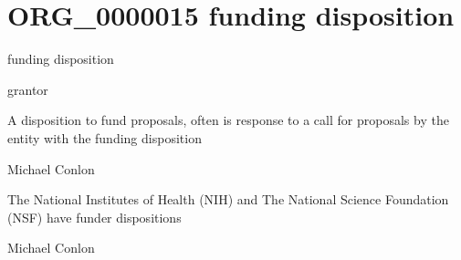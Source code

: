 \documentclass[letterpaper,10pt,english]{sphinxmanual}
\begin{document}
\section{ORG\_0000015 \sphinxhyphen{} funding disposition}
\label{\detokenize{doc-ORG_0000015:org-0000015-funding-disposition}}\label{\detokenize{doc-ORG_0000015:index-0}}\label{\detokenize{doc-ORG_0000015::doc}}
\begin{sphinxShadowBox}

\sphinxAtStartPar
funding disposition
\end{sphinxShadowBox}

\begin{sphinxShadowBox}

\sphinxAtStartPar
grantor
\end{sphinxShadowBox}

\begin{sphinxShadowBox}

\sphinxAtStartPar
A disposition to fund proposals, often is response to a call for proposals by the entity with the funding disposition
\end{sphinxShadowBox}

\begin{sphinxShadowBox}

\sphinxAtStartPar
Michael Conlon 
\end{sphinxShadowBox}

\begin{sphinxShadowBox}

\sphinxAtStartPar
The National Institutes of Health (NIH) and The National Science Foundation (NSF) have funder dispositions
\end{sphinxShadowBox}

\begin{sphinxShadowBox}

\sphinxAtStartPar
Michael Conlon 
\end{sphinxShadowBox}
\begin{quote}
\label{\detokenize{doc-ORG_0000016:org-0000016}}\label{\detokenize{doc-ORG_0000016:health-care-service-provider-disposition}}\label{\detokenize{doc-ORG_0000016:org-0000016}}
\ignorespaces \end{quote}
\end{document}
